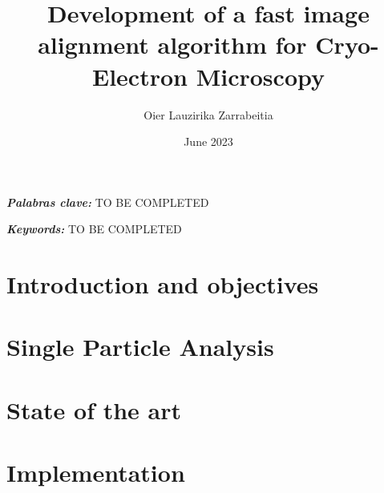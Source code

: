 \documentclass{etsit-report}
\title{Development of a fast image alignment algorithm for Cryo-Electron Microscopy}
\author{Oier Lauzirika Zarrabeitia}
\date{June 2023}
\begin{document}
\frontmatter

\cleardoublepage
\makefrontpage

\cleardoublepage
\makeinfopage

\cleardoublepage
\maketitle

\newpage\thispagestyle{empty}
\begin{otherlanguage}{spanish}
\begin{abstract}
    
\end{abstract}
\textit{\textbf{Palabras clave:}}
TO BE COMPLETED

\newpage\thispagestyle{empty}
\end{otherlanguage}
\begin{abstract}
    
\end{abstract}
\textit{\textbf{Keywords: }}
TO BE COMPLETED

\cleardoublepage
\tableofcontents
\listoffigures
\listoftables

\printglossary[type=\acronymtype]

\mainmatter

\chapter{Introduction and objectives}
\label{chap:introduction}


\chapter{Single Particle Analysis}
\label{chap:spa}


\chapter{State of the art}
\label{chap:state_of_the_art}


\chapter{Implementation}
\label{chap:implementation}

\end{document}
